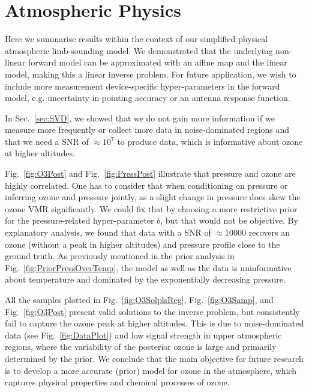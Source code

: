 \section{Atmospheric Physics}
Here we summarise results within the context of our simplified physical atmospheric limb-sounding model.
We demonstrated that the underlying non-linear forward model can be approximated with an affine map and the linear model, making this a linear inverse problem.
For future application, we wish to include more measurement device-specific hyper-parameters in the forward model, e.g. uncertainty in pointing accuracy or an antenna response function.

In Sec.~\ref{sec:SVD}, we showed that we do not gain more information if we measure more frequently or collect more data in noise-dominated regions and that we need a SNR of $\approx10^7$ to produce data, which is informative about ozone at higher altitudes.

Fig.~\ref{fig:O3Post} and Fig.~\ref{fig:PressPost} illustrate that pressure and ozone are highly correlated.
One has to consider that when conditioning on pressure or inferring ozone and pressure jointly, as a slight change in pressure does skew the ozone VMR significantly.
We could fix that by choosing a more restrictive prior for the pressure-related hyper-parameter $b$, but that would not be objective.
By explanatory analysis, we found that data with a SNR of $\approx 10000$ recovers an ozone (without a peak in higher altitudes) and pressure profile close to the ground truth.
As previously mentioned in the prior analysis in Fig.~\ref{fig:PriorPressOverTemp}, the model as well as the data is uninformative about temperature and dominated by the exponentially decreasing pressure.

All the samples plotted in Fig.~\ref{fig:O3SolplsReg}, Fig.~\ref{fig:O3Samp}, and Fig.~\ref{fig:O3Post} present valid solutions to the inverse problem, but consistently fail to capture the ozone peak at higher altitudes.
This is due to noise-dominated data (see Fig.~\ref{fig:DataPlot}) and low signal strength in upper atmospheric regions, where the variability of the posterior ozone is large and primarily determined by the prior.
We conclude that the main objective for future research is to develop a more accurate (prior) model for ozone in the atmosphere, which captures physical properties and chemical processes of ozone.




